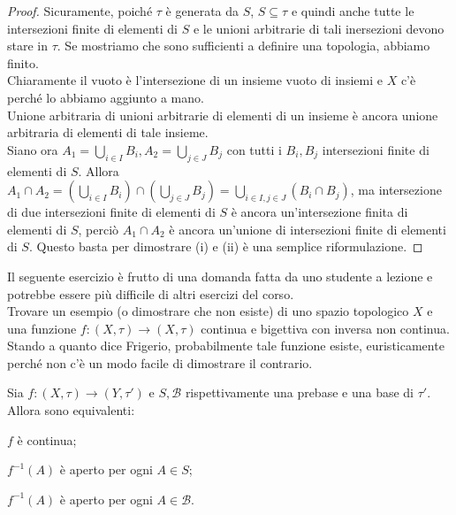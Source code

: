 \documentclass{article}
\begin{document}
\begin{proof}
	Sicuramente, poiché $\tau$ è generata da $S$, $S \subseteq \tau$ e quindi anche tutte le intersezioni finite di elementi di $S$ e le unioni arbitrarie di tali inersezioni devono stare in $\tau$. Se mostriamo che sono sufficienti a definire una topologia, abbiamo finito. \\
	Chiaramente il vuoto è l'intersezione di un insieme vuoto di insiemi e $X$ c'è perché lo abbiamo aggiunto a mano. \\
	Unione arbitraria di unioni arbitrarie di elementi di un insieme è ancora unione arbitraria di elementi di tale insieme. \\
	Siano ora $\displaystyle A_1= \bigcup_{i \in I} B_i, A_2=\bigcup_{j \in J} B_j$ con tutti i $B_i, B_j$ intersezioni finite di elementi di $S$. Allora $\displaystyle A_1 \cap A_2 = \left( \bigcup_{i \in I} B_i \right) \cap \left(\bigcup_{j \in J} B_j \right)= \bigcup_{i \in I, j \in J} (B_i \cap B_j)$, ma  intersezione di due intersezioni finite di elementi di $S$ è ancora un'intersezione finita di elementi di $S$, perciò $A_1 \cap A_2$ è ancora un'unione di intersezioni finite di elementi di $S$. Questo basta per dimostrare (i) e (ii) è una semplice riformulazione.
\end{proof}

\begin{exc}
	\warningsign\quad Il seguente esercizio è frutto di una domanda fatta da uno studente a lezione e potrebbe essere più difficile di altri esercizi del corso. \\
	Trovare un esempio (o dimostrare che non esiste) di uno spazio topologico $X$ e una funzione $f: (X, \tau) \rightarrow (X, \tau)$ continua e bigettiva con inversa non continua. \\
	Stando a quanto dice Frigerio, probabilmente tale funzione esiste, euristicamente perché non c'è un modo facile di dimostrare il contrario.
\end{exc}

\begin{prop}
	Sia $f: (X, \tau) \rightarrow (Y, \tau')$ e $S, \mathcal{B}$ rispettivamente una prebase e una base di $\tau'$. Allora sono equivalenti:
	\begin{nlist}
		\item $f$ è continua;
		\item $f^{-1}(A)$ è aperto per ogni $A \in S$;
		\item $f^{-1}(A)$ è aperto per ogni $A \in \mathcal{B}$.
	\end{nlist}
\end{prop}
\end{document}
